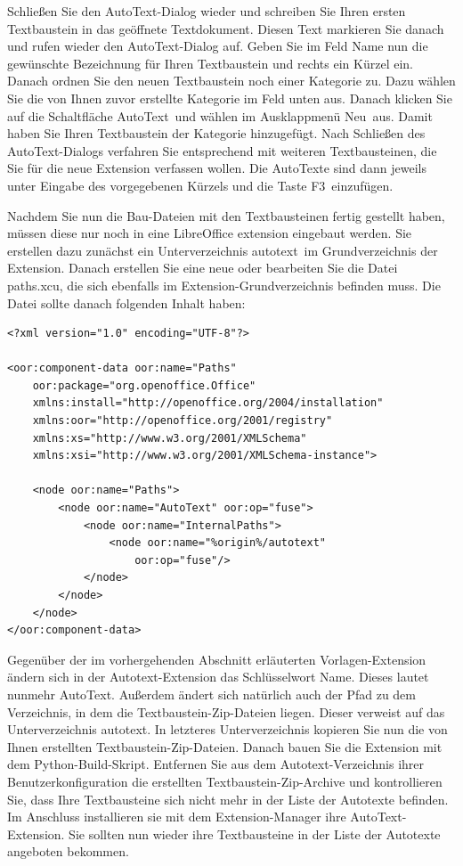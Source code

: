 \documentclass[a4paper,10pt,pagesize,titlepage]{scrbook}
\begin{document}
Schließen Sie den AutoText-Dialog wieder und schreiben Sie Ihren ersten Textbaustein in das geöffnete Textdokument. Diesen Text markieren Sie danach und rufen wieder den AutoText-Dialog auf. Geben Sie im Feld Name nun die gewünschte Bezeichnung für Ihren Textbaustein und rechts ein Kürzel ein. Danach ordnen Sie den neuen Textbaustein noch einer Kategorie zu. Dazu wählen Sie die von Ihnen zuvor erstellte Kategorie im Feld unten aus. Danach klicken Sie auf die Schaltfläche \glqq AutoText\grqq~und wählen im Ausklappmenü \glqq Neu\grqq~aus. Damit haben Sie Ihren Textbaustein der Kategorie hinzugefügt. Nach Schließen des AutoText-Dialogs verfahren Sie entsprechend mit weiteren Textbausteinen, die Sie für die neue Extension verfassen wollen. Die AutoTexte sind dann jeweils unter Eingabe des vorgegebenen Kürzels und die Taste \glqq F3\grqq~einzufügen.

Nachdem Sie nun die Bau-Dateien mit den Textbausteinen fertig gestellt haben, müssen diese nur noch in eine LibreOffice extension eingebaut werden. Sie erstellen dazu zunächst ein Unterverzeichnis \glqq autotext\grqq~im Grundverzeichnis der Extension. Danach erstellen Sie eine neue oder bearbeiten Sie die Datei \glqq paths.xcu\grqq, die sich ebenfalls im Extension-Grundverzeichnis befinden muss. Die Datei sollte danach folgenden Inhalt haben:


\begin{lstlisting}
<?xml version="1.0" encoding="UTF-8"?>

<oor:component-data oor:name="Paths" 
    oor:package="org.openoffice.Office" 
    xmlns:install="http://openoffice.org/2004/installation" 
    xmlns:oor="http://openoffice.org/2001/registry"
    xmlns:xs="http://www.w3.org/2001/XMLSchema" 
    xmlns:xsi="http://www.w3.org/2001/XMLSchema-instance">

    <node oor:name="Paths">
        <node oor:name="AutoText" oor:op="fuse">
            <node oor:name="InternalPaths">
                <node oor:name="%origin%/autotext" 
                    oor:op="fuse"/>
            </node>
        </node>
    </node>
</oor:component-data>
\end{lstlisting}

Gegenüber der im vorhergehenden Abschnitt erläuterten Vorlagen-Extension ändern sich in der Autotext-Extension das Schlüsselwort Name. Dieses lautet nunmehr \glqq AutoText\grqq. Außerdem ändert sich natürlich auch der Pfad zu dem Verzeichnis, in dem die Textbaustein-Zip-Dateien liegen. Dieser verweist auf das Unterverzeichnis \glqq autotext\grqq. In letzteres Unterverzeichnis kopieren Sie nun die von Ihnen erstellten Textbaustein-Zip-Dateien. Danach bauen Sie die Extension mit dem Python-Build-Skript. Entfernen Sie aus dem Autotext-Verzeichnis ihrer Benutzerkonfiguration die erstellten Textbaustein-Zip-Archive und kontrollieren Sie, dass Ihre Textbausteine sich nicht mehr in der Liste der Autotexte befinden. Im Anschluss installieren sie mit dem Extension-Manager ihre AutoText-Extension. Sie sollten nun wieder ihre Textbausteine in der Liste der Autotexte angeboten bekommen.
\end{document}

